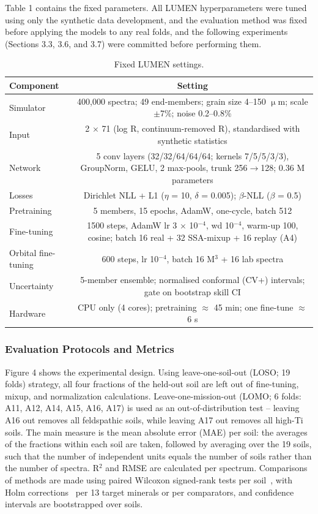 \documentclass[remotesensing,article,submit,pdftex,moreauthors]{Definitions/mdpi}
\begin{document}
Table 1 contains the fixed parameters. All LUMEN hyperparameters were tuned using only the synthetic data development, and the evaluation method was fixed before applying the models to any real folds, and the following experiments (Sections 3.3, 3.6, and 3.7) were committed before performing them.

\begin{table}[H]
\caption{Fixed LUMEN settings.\label{tab1}}
\small
\begin{tabularx}{\textwidth}{LC}
\toprule
\textbf{Component} & \textbf{Setting} \\
\midrule
Simulator & 400,000 spectra; 49 end-members; grain size 4--150 $\upmu$m; scale $\pm$7\%; noise 0.2--0.8\% \\
Input & 2 $\times$ 71 (log R, continuum-removed R), standardised with synthetic statistics \\
Network & 5 conv layers (32/32/64/64/64; kernels 7/5/5/3/3), GroupNorm, GELU, 2 max-pools, trunk 256$\rightarrow$128; 0.36 M parameters \\
Losses & Dirichlet NLL + L1 ($\eta$ = 10, $\delta$ = 0.005); $\beta$-NLL ($\beta$ = 0.5) \\
Pretraining & 5 members, 15 epochs, AdamW, one-cycle, batch 512 \\
Fine-tuning & 1500 steps, AdamW lr 3 $\times$ 10$^{-4}$, wd 10$^{-4}$, warm-up 100, cosine; batch 16 real + 32 SSA-mixup + 16 replay (A4) \\
Orbital fine-tuning & 600 steps, lr 10$^{-4}$, batch 16 M$^{3}$ + 16 lab spectra \\
Uncertainty & 5-member ensemble; normalised conformal (CV+) intervals; gate on bootstrap skill CI \\
Hardware & CPU only (4 cores); pretraining $\approx$ 45 min; one fine-tune $\approx$ 6 s \\
\bottomrule
\end{tabularx}
\end{table}

\subsubsection{Evaluation Protocols and Metrics}

Figure 4 shows the experimental design. Using leave-one-soil-out (LOSO; 19 folds) strategy, all four fractions of the held-out soil are left out of fine-tuning, mixup, and normalization calculations. Leave-one-mission-out (LOMO; 6 folds: A11, A12, A14, A15, A16, A17) is used as an out-of-distribution test -- leaving A16 out removes all feldspathic soils, while leaving A17 out removes all high-Ti soils. The main measure is the mean absolute error (MAE) per soil: the averages of the fractions within each soil are taken, followed by averaging over the 19 soils, such that the number of independent units equals the number of soils rather than the number of spectra. R$^{2}$ and RMSE are calculated per spectrum. Comparisons of methods are made using paired Wilcoxon signed-rank tests per soil~\cite{wilcoxon1945}, with Holm corrections~\cite{holm1979} per 13 target minerals or per comparators, and confidence intervals are bootstrapped over soils.
\end{document}
